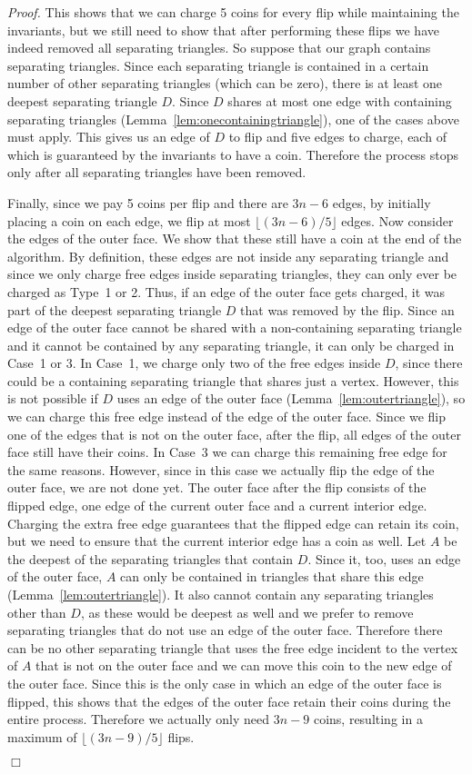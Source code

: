 \pdfoutput=1 \documentclass[12pt]{elsarticle}
\newenvironment{proof}{\emph{Proof.}}{\hfill $\Box$ \medskip\\}
\begin{document}
\begin{proof}
 \medskip
 This shows that we can charge 5 coins for every flip while maintaining the invariants, but we still need to show that after performing these flips we have indeed removed all separating triangles. So suppose that our graph contains separating triangles. Since each separating triangle is contained in a certain number of other separating triangles (which can be zero), there is at least one deepest separating triangle $D$. Since $D$ shares at most one edge with containing separating triangles (Lemma~\ref{lem:onecontainingtriangle}), one of the cases above must apply. This gives us an edge of $D$ to flip and five edges to charge, each of which is guaranteed by the invariants to have a coin. Therefore the process stops only after all separating triangles have been removed.
 
 Finally, since we pay 5 coins per flip and there are $3n - 6$ edges, by initially placing a coin on each edge, we flip at most $\lfloor(3n - 6)/5\rfloor$ edges.
Now consider the edges of the outer face. We show that these still have a coin at the end of the algorithm. By definition, these edges are not inside any separating triangle and since we only charge free edges inside separating triangles, they can only ever be charged as Type~1 or 2. Thus, if an edge of the outer face gets charged, it was part of the deepest separating triangle $D$ that was removed by the flip. Since an edge of the outer face cannot be shared with a non-containing separating triangle and it cannot be contained by any separating triangle, it can only be charged in Case~1 or 3. In Case~1, we charge only two of the free edges inside $D$, since there could be a containing separating triangle that shares just a vertex. However, this is not possible if $D$ uses an edge of the outer face (Lemma~\ref{lem:outertriangle}), so we can charge this free edge instead of the edge of the outer face. Since we flip one of the edges that is not on the outer face, after the flip, all edges of the outer face still have their coins. In Case~3 we can charge this remaining free edge for the same reasons. However, since in this case we actually flip the edge of the outer face, we are not done yet. The outer face after the flip consists of the flipped edge, one edge of the current outer face and a current interior edge. Charging the extra free edge guarantees that the flipped edge can retain its coin, but we need to ensure that the current interior edge has a coin as well. Let $A$ be the deepest of the separating triangles that contain $D$. Since it, too, uses an edge of the outer face, $A$ can only be contained in triangles that share this edge (Lemma~\ref{lem:outertriangle}). It also cannot contain any separating triangles other than $D$, as these would be deepest as well and we prefer to remove separating triangles that do not use an edge of the outer face. Therefore there can be no other separating triangle that uses the free edge incident to the vertex of $A$ that is not on the outer face and we can move this coin to the new edge of the outer face. Since this is the only case in which an edge of the outer face is flipped, this shows that the edges of the outer face retain their coins during the entire process. Therefore we actually only need $3n - 9$ coins, resulting in a maximum of $\lfloor(3n - 9)/5\rfloor$ flips.

\end{proof}
\end{document}
